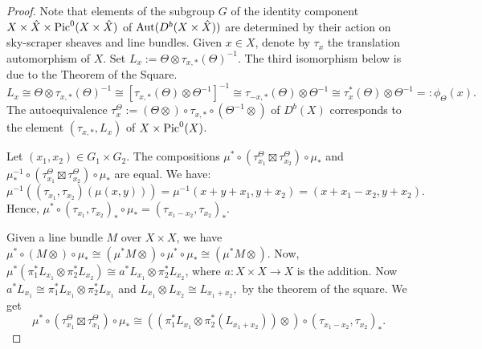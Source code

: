 \documentclass[12pt]{amsart}
\numberwithin{equation}{subsection}
\theoremstyle{plain}
\theoremstyle{definition}
\newcommand{\Pic}{{\rm Pic}}
\newcommand{\Aut}{{\rm Aut}}
\begin{document}
\begin{proof}
Note that elements of the subgroup $G$ of the identity component $X\times\hat{X}\times\Pic^0(X\times\hat{X})$ of $\Aut(D^b(X\times\hat{X}))$ are determined by their action on 
sky-scraper sheaves and line bundles.
Given $x\in X$, denote by $\tau_x$ the translation automorphism of $X$. 
Set $L_x:=\Theta\otimes\tau_{x,*}(\Theta)^{-1}$. The third isomorphism below is due to the Theorem of the Square. 
\[
L_x\cong\Theta\otimes\tau_{x,*}(\Theta)^{-1}\cong
[\tau_{x,*}(\Theta)\otimes\Theta^{-1}]^{-1}\cong
\tau_{-x,*}(\Theta)\otimes\Theta^{-1}\cong 
\tau_x^*(\Theta)\otimes\Theta^{-1}=:\phi_\Theta(x).
\]
The autoequivalence $\tau_x^\Theta:=(\Theta\otimes)\circ\tau_{x,*}\circ(\Theta^{-1}\otimes)$ of $D^b(X)$
corresponds to the element $(\tau_{x,*},L_x)$ of $X\times \Pic^0(X)$.

Let $(x_1,x_2)\in G_1\times G_2$. 
The compositions $\mu^*\circ (\tau_{x_1}^\Theta\boxtimes\tau_{x_2}^\Theta)  \circ\mu_*$ and
$\mu^{-1}_*\circ (\tau_{x_1}^\Theta\boxtimes\tau_{x_2}^\Theta)  \circ\mu_*$ are equal. We have:
\[
\mu^{-1}((\tau_{x_1},\tau_{x_2})(\mu(x,y)))=\mu^{-1}(x+y+x_1,y+x_2)=(x+x_1-x_2,y+x_2).
\]
Hence,  $\mu^*\circ (\tau_{x_1},\tau_{x_2})_*  \circ\mu_*=(\tau_{x_1-x_2},\tau_{x_2})_*.$

Given a line bundle $M$ over $X\times X$, we have 
$\mu^*\circ (M\otimes)\circ \mu_*\cong (\mu^*M\otimes)\circ \mu^*\circ\mu_*\cong (\mu^*M\otimes)$.
Now, $\mu^*(\pi_1^*L_{x_1}\otimes \pi_2^*L_{x_2})\cong a^*L_{x_1}\otimes \pi_2^*L_{x_2}$, where $a:X\times X\rightarrow X$ is the addition. Now $a^*L_{x_1}\cong \pi_1^*L_{x_1}\otimes \pi_2^*L_{x_1}$ and $L_{x_1}\otimes L_{x_2}\cong L_{x_1+x_2},$ by the theorem of the square.
We get
\[
\mu^*\circ (\tau_{x_1}^\Theta\boxtimes\tau_{x_1}^\Theta)  \circ\mu_*\cong
((\pi_1^*L_{x_1}\otimes \pi_2^*(L_{x_1+x_2}))\otimes)\circ (\tau_{x_1-x_2},\tau_{x_2})_*.
\]


\end{proof}
\end{document}
